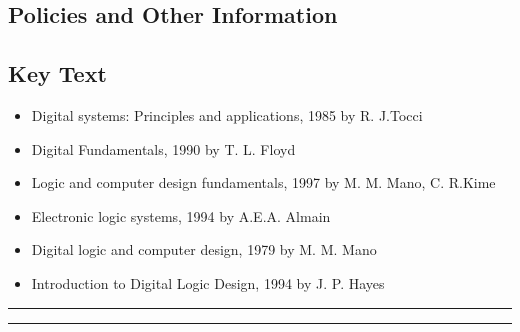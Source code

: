 
\subsection*{Policies and Other Information}
\subsection*{Key Text}
\begin{itemize}
    \item Digital systems: Principles and applications, 1985 by  R. J.Tocci
    \item Digital Fundamentals, 1990 by  T. L. Floyd
    \item Logic and computer design fundamentals, 1997 by  M. M. Mano, C. R.Kime
    \item Electronic logic systems, 1994 by A.E.A. Almain
    \item Digital logic and computer design, 1979 by M. M. Mano
    \item Introduction to Digital Logic Design, 1994 by J. P. Hayes
\end{itemize}
\vspace{2ex}\hrule
\vspace{2ex}\hrule\vspace{2ex}
